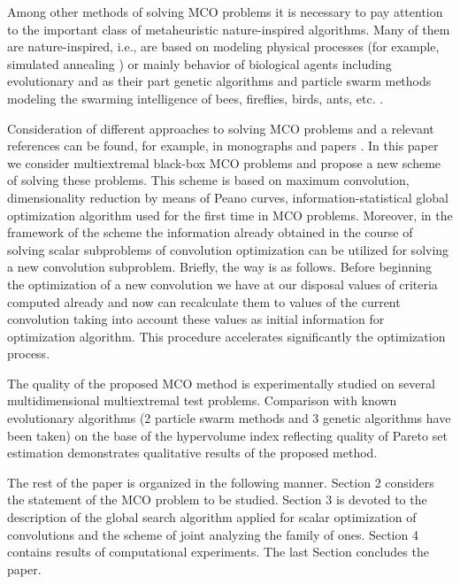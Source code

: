 \documentclass[]{interact}
\theoremstyle{plain}%
\theoremstyle{definition}
\theoremstyle{remark}
\begin{document}
Among other methods of solving MCO problems it is necessary to pay attention to the important class of metaheuristic nature-inspired algorithms. Many of them are nature-inspired, i.e.,  are  based on modeling physical processes (for example, simulated annealing \cite{Locatelli2002,Aarts2014}) or mainly behavior of biological agents including evolutionary \cite{Price2005,Coello2007} and as their part genetic algorithms \cite{Ruiz2015,Deb2002,Zitzler2001} and particle swarm methods modeling the swarming intelligence of bees, fireflies, birds, ants, etc. \cite{Mostaghim2007,Nebro2009,Durillo2010}.

Consideration of different approaches to solving MCO problems and a relevant references can be found, for example, in monographs and papers \cite{Miettinen1999,Ehrgott2005,Zhou2011,Nedjah2015,Pardalos2017}.
In this paper we consider multiextremal black-box MCO problems and propose a new scheme of solving these problems. This scheme is based on maximum convolution, dimensionality reduction by means of Peano curves, information-statistical global optimization algorithm used for the first time in MCO problems. Moreover, in the framework of the scheme the information already obtained in the course of solving scalar subproblems of convolution optimization can be utilized for solving a new convolution subproblem. Briefly, the way is as follows. Before beginning the optimization of a new convolution we have at our disposal values of criteria computed already and now can recalculate them to values of the current convolution taking into account these values as initial information for optimization algorithm. This procedure accelerates significantly the optimization process.

The quality of the proposed MCO method is experimentally studied on several multidimensional multiextremal test problems. Comparison with known evolutionary algorithms (2 particle swarm methods and 3 genetic algorithms have been taken) on the base of the hypervolume index \cite{Evtushenko2014,Zilinskas2015} reflecting quality of Pareto set estimation demonstrates qualitative results of the proposed method.

The rest of the paper is organized in the following manner. Section 2 considers the statement of the MCO problem to be studied. Section 3 is devoted to the description of the global search algorithm applied for scalar optimization of convolutions and the scheme of joint analyzing the family of ones. Section 4 contains results of computational experiments. The last Section concludes the paper.
\end{document}
